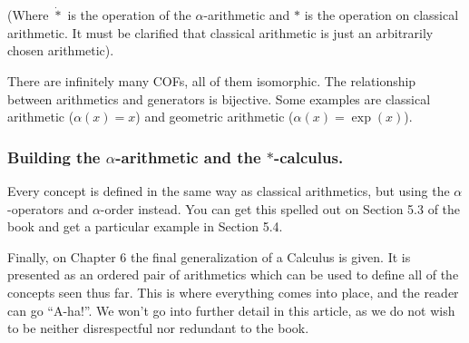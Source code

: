 (Where $\dot{*}$ is the operation of the $\alpha$-arithmetic and $*$ is the operation on classical arithmetic. It must be clarified that classical arithmetic is just an arbitrarily chosen arithmetic).

There are infinitely many COFs, all of them isomorphic. The relationship between arithmetics and generators is bijective. Some examples are classical arithmetic ($\alpha(x) = x$) and geometric arithmetic ($\alpha(x) = \exp(x)$).

\subsubsection{Building the $\alpha$-arithmetic and the $*$-calculus.}

Every concept is defined in the same way as classical arithmetics, but using the $\alpha$-operators and $\alpha$-order instead. You can get this spelled out on Section 5.3 of the book and get a particular example in Section 5.4.

Finally, on Chapter 6 the final generalization of a Calculus is given. It is presented as an ordered pair of arithmetics which can be used to define all of the concepts seen thus far. This is where everything comes into place, and the reader can go \enquote{A-ha!}. We won't go into further detail in this article, as we do not wish to be neither disrespectful nor redundant to the book.
